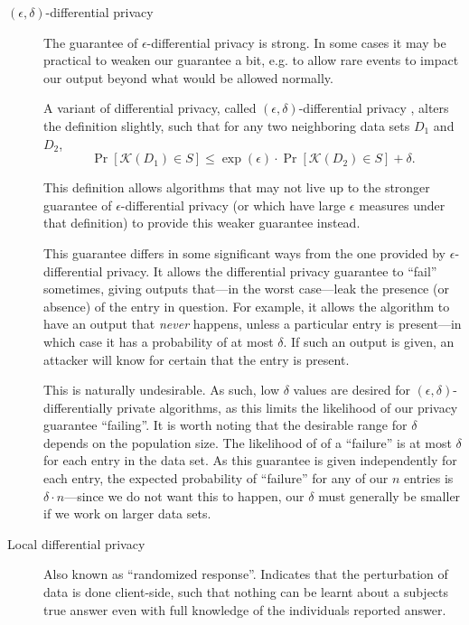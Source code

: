 \documentclass[12pt]{article}
\newcommand{\fancy}{\mathcal}
\begin{document}
\begin{description}
    \item[$(\epsilon, \delta)$-differential privacy] The guarantee of $\epsilon$-differential privacy is strong. In some cases it may be practical to weaken our guarantee a bit, e.g. to allow rare events to impact our output beyond what would be allowed normally.
    
    A variant of differential privacy, called $(\epsilon, \delta)$-differential privacy \cite{dwork2006_delta_diffpriv}, alters the definition slightly, such that for any two neighboring data sets $D_1$ and $D_2$,
    \begin{equation}
        \Pr[\fancy{K}(D_1) \in S] \leq \exp(\epsilon) \cdot \Pr[\fancy{K}(D_2) \in S] + \delta.
    \end{equation}
    
    This definition allows algorithms that may not live up to the stronger guarantee of $\epsilon$-differential privacy (or which have large $\epsilon$ measures under that definition) to provide this weaker guarantee instead.
    
    This guarantee differs in some significant ways from the one provided by $\epsilon$-differential privacy. It allows the differential privacy guarantee to ``fail'' sometimes, giving outputs that---in the worst case---leak the presence (or absence) of the entry in question. For example, it allows the algorithm to have an output that \emph{never} happens, unless a particular entry is present---in which case it has a probability of at most $\delta$. If such an output is given, an attacker will know for certain that the entry is present.
    
    This is naturally undesirable. As such, low $\delta$ values are desired for $(\epsilon, \delta)$-differentially private algorithms, as this limits the likelihood of our privacy guarantee ``failing''. It is worth noting that the desirable range for $\delta$ depends on the population size. The likelihood of of a ``failure'' is at most $\delta$ for each entry in the data set. As this guarantee is given independently for each entry, the expected probability of ``failure'' for any of our $n$ entries is $\delta \cdot n$---since we do not want this to happen, our $\delta$ must generally be smaller if we work on larger data sets.
    
    \item[Local differential privacy] Also known as ``randomized response''. Indicates that the perturbation of data is done client-side, such that nothing can be learnt about a subjects true answer even with full knowledge of the individuals reported answer.
\end{description}
\end{document}
